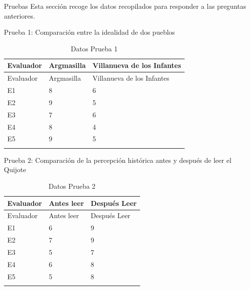 \documentclass[
  ignorenonframetext,
]{beamer}
\begin{document}
\begin{frame}{Pruebas}
\label{sec-pruebas}
Esta sección recoge los datos recopilados para responder a las preguntas
anteriores.

\begin{block}{Prueba 1: Comparación entre la idealidad de dos pueblos}
\label{sec-pruebas1}
\begin{longtable}[]{@{}lll@{}}
\caption{Datos Prueba 1}\label{tbl-prueba1}\tabularnewline
\toprule\noalign{}
Evaluador & Argmasilla & Villanueva de los Infantes \\
\midrule\noalign{}
\endfirsthead
\toprule\noalign{}
Evaluador & Argmasilla & Villanueva de los Infantes \\
\midrule\noalign{}
\endhead
E1 & 8 & 6 \\
E2 & 9 & 5 \\
E3 & 7 & 6 \\
E4 & 8 & 4 \\
E5 & 9 & 5 \\
\bottomrule\noalign{}
\end{longtable}
\end{block}
\end{frame}

\begin{frame}
\begin{block}{Prueba 2: Comparación de la percepción histórica antes y
después de leer el Quijote}
\label{sec-prueba2}
\begin{longtable}[]{@{}lll@{}}
\caption{Datos Prueba 2}\label{tbl-prueba2}\tabularnewline
\toprule\noalign{}
Evaluador & Antes leer & Después Leer \\
\midrule\noalign{}
\endfirsthead
\toprule\noalign{}
Evaluador & Antes leer & Después Leer \\
\midrule\noalign{}
\endhead
E1 & 6 & 9 \\
E2 & 7 & 9 \\
E3 & 5 & 7 \\
E4 & 6 & 8 \\
E5 & 5 & 8 \\
\bottomrule\noalign{}
\end{longtable}
\end{block}
\end{frame}
\end{document}
